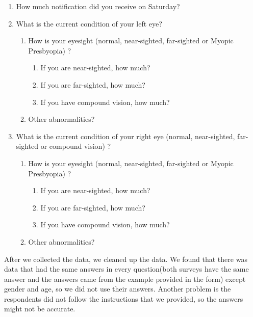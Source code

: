 \begin{multicols}{2}
\begin{enumerate}
        \item How much notification did you receive on Saturday?
        \item What is the current condition of your left eye?
        \begin{enumerate}[label=21.\arabic*]
            \item How is your eyesight (normal, near-sighted, far-sighted or Myopic Presbyopia) ?
            \begin{enumerate}[label=21.1.\arabic*]
                \item If you are near-sighted, how much?
                \item If you are far-sighted, how much?
                \item If you have compound vision, how much?
            \end{enumerate}
            \item Other abnormalities?
        \end{enumerate}
        \item What is the current condition of your right eye (normal, near-sighted, far-sighted or compound vision) ?
        \begin{enumerate}[label=22.\arabic*]
            \item How is your eyesight (normal, near-sighted, far-sighted or Myopic Presbyopia) ?
            \begin{enumerate}[label=22.1.\arabic*]
                \item If you are near-sighted, how much?
                \item If you are far-sighted, how much?
                \item If you have compound vision, how much?
            \end{enumerate}
            \item Other abnormalities?
        \end{enumerate}
    \end{enumerate}
\end{multicols}
After we collected the data, we cleaned up the data. We found that there was data that had the same answers in every question(both surveys have the same answer and the answers came from the example provided in the form) except gender and age, so we did not use their answers. Another problem is the respondents did not follow the instructions that we provided, so the answers might not be accurate.\\ \par
